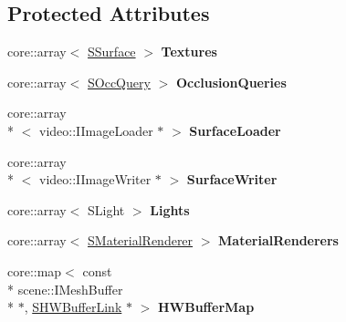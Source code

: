 \subsection*{Protected Attributes}
\begin{DoxyCompactItemize}
\item 
\hypertarget{classirr_1_1video_1_1_c_null_driver_ad8be2010c24b2e3c679767684d56ced8}{core\-::array$<$ \hyperlink{structirr_1_1video_1_1_c_null_driver_1_1_s_surface}{S\-Surface} $>$ {\bfseries Textures}}\label{classirr_1_1video_1_1_c_null_driver_ad8be2010c24b2e3c679767684d56ced8}

\item 
\hypertarget{classirr_1_1video_1_1_c_null_driver_aac17ca115a27a9842cd942e2f837fef1}{core\-::array$<$ \hyperlink{structirr_1_1video_1_1_c_null_driver_1_1_s_occ_query}{S\-Occ\-Query} $>$ {\bfseries Occlusion\-Queries}}\label{classirr_1_1video_1_1_c_null_driver_aac17ca115a27a9842cd942e2f837fef1}

\item 
\hypertarget{classirr_1_1video_1_1_c_null_driver_a934b214102913db45d756ec03002860f}{core\-::array\\*
$<$ video\-::\-I\-Image\-Loader $\ast$ $>$ {\bfseries Surface\-Loader}}\label{classirr_1_1video_1_1_c_null_driver_a934b214102913db45d756ec03002860f}

\item 
\hypertarget{classirr_1_1video_1_1_c_null_driver_a9bfae8d1cfbfa7c7e393c303d581f4ea}{core\-::array\\*
$<$ video\-::\-I\-Image\-Writer $\ast$ $>$ {\bfseries Surface\-Writer}}\label{classirr_1_1video_1_1_c_null_driver_a9bfae8d1cfbfa7c7e393c303d581f4ea}

\item 
\hypertarget{classirr_1_1video_1_1_c_null_driver_a3a70b729af85e179e20571b21659ac4c}{core\-::array$<$ S\-Light $>$ {\bfseries Lights}}\label{classirr_1_1video_1_1_c_null_driver_a3a70b729af85e179e20571b21659ac4c}

\item 
\hypertarget{classirr_1_1video_1_1_c_null_driver_ac68b4e82e7d623c3a7e1b616c8581cc7}{core\-::array$<$ \hyperlink{structirr_1_1video_1_1_c_null_driver_1_1_s_material_renderer}{S\-Material\-Renderer} $>$ {\bfseries Material\-Renderers}}\label{classirr_1_1video_1_1_c_null_driver_ac68b4e82e7d623c3a7e1b616c8581cc7}

\item 
\hypertarget{classirr_1_1video_1_1_c_null_driver_a827cb843b35e6cd94e33741516255f97}{core\-::map$<$ const \\*
scene\-::\-I\-Mesh\-Buffer \\*
$\ast$, \hyperlink{structirr_1_1video_1_1_c_null_driver_1_1_s_h_w_buffer_link}{S\-H\-W\-Buffer\-Link} $\ast$ $>$ {\bfseries H\-W\-Buffer\-Map}}\label{classirr_1_1video_1_1_c_null_driver_a827cb843b35e6cd94e33741516255f97}


\end{DoxyCompactItemize}
